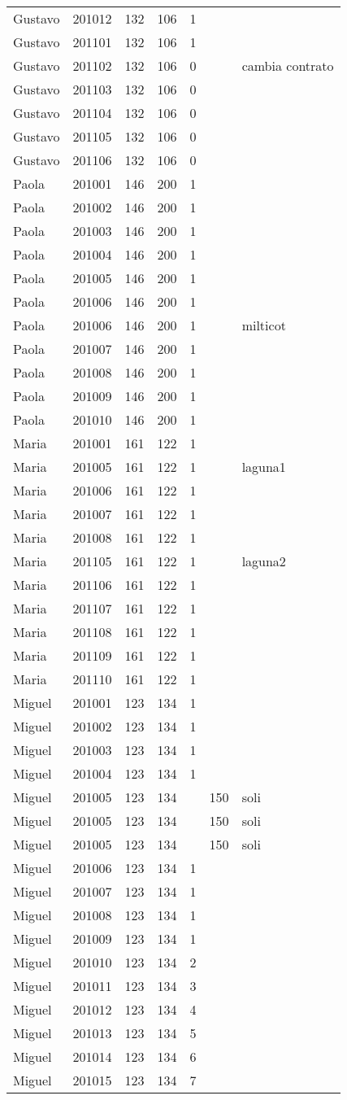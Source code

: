 \begin{tabular}{m{30pt}<{\raggedrigth}*{5}{m{25pt}<{\centering}}m{80pt}<{\raggedleft}}
Gustavo&201012&132&106&1&&\\
Gustavo&201101&132&106&1&&\\
Gustavo&201102&132&106&0&&cambia contrato\\
Gustavo&201103&132&106&0&&\\
Gustavo&201104&132&106&0&&\\
Gustavo&201105&132&106&0&&\\
Gustavo&201106&132&106&0&&\\
Paola&201001&146&200&1&&\\
Paola&201002&146&200&1&&\\
Paola&201003&146&200&1&&\\
Paola&201004&146&200&1&&\\
Paola&201005&146&200&1&&\\
Paola&201006&146&200&1&&\\
Paola&201006&146&200&1&&milticot\\
Paola&201007&146&200&1&&\\
Paola&201008&146&200&1&&\\
Paola&201009&146&200&1&&\\
Paola&201010&146&200&1&&\\
Maria&201001&161&122&1&&\\
Maria&201005&161&122&1&&laguna1\\
Maria&201006&161&122&1&&\\
Maria&201007&161&122&1&&\\
Maria&201008&161&122&1&&\\
Maria&201105&161&122&1&&laguna2\\
Maria&201106&161&122&1&&\\
Maria&201107&161&122&1&&\\
Maria&201108&161&122&1&&\\
Maria&201109&161&122&1&&\\
Maria&201110&161&122&1&&\\
Miguel&201001&123&134&1&&\\
Miguel&201002&123&134&1&&\\
Miguel&201003&123&134&1&&\\
Miguel&201004&123&134&1&&\\
Miguel&201005&123&134&&150&soli\\
Miguel&201005&123&134&&150&soli\\
Miguel&201005&123&134&&150&soli\\
Miguel&201006&123&134&1&&\\
Miguel&201007&123&134&1&&\\
Miguel&201008&123&134&1&&\\
Miguel&201009&123&134&1&&\\
Miguel&201010&123&134&2&&\\
Miguel&201011&123&134&3&&\\
Miguel&201012&123&134&4&&\\
Miguel&201013&123&134&5&&\\
Miguel&201014&123&134&6&&\\
Miguel&201015&123&134&7&&\\
\bottomrule
\end{tabular}
